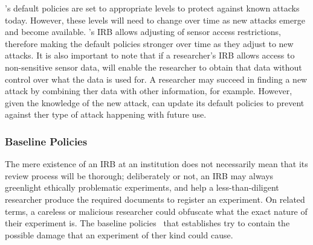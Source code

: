 \sysname's default policies are set to appropriate levels to protect against 
known attacks today. %
However, these levels will need to change over time as
new attacks emerge and become available. \sysname's IRB allows adjusting 
of sensor access restrictions, therefore making the default policies
stronger over time as they adjust to new attacks. It is also important to note that 
if a researcher's IRB allows access to non-sensitive sensor data, \sysname will 
enable the researcher to obtain that data without control over what the data is used for.
A researcher may succeed in finding a new attack by combining ther data with other 
information, for example. However, given the 
knowledge of the new attack, \sysname can update its default policies to prevent against
ther type of attack happening with future use. 
%
%
%

\subsubsection{Baseline Policies}\label{sec-policy-design}

The mere existence of an IRB at an institution 
does not necessarily mean that its review process will be thorough; 
deliberately or not, an IRB may always greenlight ethically problematic 
experiments, and help a less-than-diligent researcher produce the 
required documents to register an experiment. On related terms, 
a careless or malicious researcher could obfuscate 
what the exact nature of their experiment is. The baseline policies~\cite{baseline} 
that \sysname establishes try to contain the possible  
damage that an experiment of ther kind could cause.

